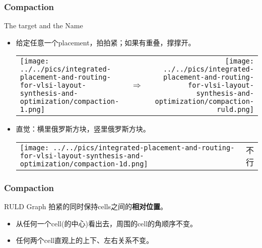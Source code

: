 \documentclass[UTF8,lualatex]{ctexbeamer}
\begin{document}
\begin{frame}
    \frametitle{Compaction}

    \begin{block}{The target and the Name}
        \begin{itemize}
            \item 给定任意一个placement，拍拍紧；如果有重叠，撑撑开。
                \begin{center}
                    \begin{tabu}{lcr}
                        \texttt{[image: ../../pics/integrated-placement-and-routing-for-vlsi-layout-synthesis-and-optimization/compaction-1.png]}
                        &$\Longrightarrow$
                        &\texttt{[image: ../../pics/integrated-placement-and-routing-for-vlsi-layout-synthesis-and-optimization/compaction-ruld.png]}
                    \end{tabu}
                \end{center}
            \item 直觉：横里俄罗斯方块，竖里俄罗斯方块。
                \pause
                \begin{center}
                    \begin{tabu}{lr}
                        \texttt{[image: ../../pics/integrated-placement-and-routing-for-vlsi-layout-synthesis-and-optimization/compaction-1d.png]}
                        &\Large 不行
                    \end{tabu}
                \end{center}
        \end{itemize}
    \end{block}
\end{frame}

\begin{frame}
    \frametitle{Compaction}
    
    \begin{block}{RULD Graph}
        拍紧的同时保持cells之间的\textbf{相对位置}。
        \begin{itemize}
            \item 从任何一个cell(的中心)看出去，周围的cell的角顺序不变。
            \item 任何两个cell直观上的上下、左右关系不变。
        \end{itemize}
    \end{block}
\end{frame}
\end{document}
